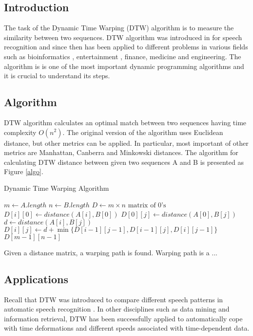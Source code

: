 \documentclass{article}
\date{\today}
\begin{document}
	\subsection*{Introduction}
	The task of the Dynamic Time Warping (DTW) algorithm is to measure the similarity between two sequences. DTW algorithm was introduced in \cite{Sakoe:1990:DPA:108235.108244} for speech recognition and since then has been applied to different problems in various fields such as bioinformatics \cite{journals/bioinformatics/AachC01}, entertainment \cite{Zhu:2003:WIE:872757.872780}, finance, medicine and engineering. The algorithm is is one of the most important dynamic programming algorithms and it is crucial to understand its steps.
	
	\subsection*{Algorithm}
	
	DTW algorithm calculates an optimal match between two sequences having time complexity $O(n^2)$. The original version of the algorithm uses Euclidean distance, but other metrics can be applied. In particular, most important of other metrics are Manhattan, Canberra and Minkowski distances. The algorithm for calculating DTW distance between given two sequences A and B is presented as Figure \ref{algo}. 
	
	\begin{algorithm}
		\caption{Dynamic Time Warping Algorithm}\label{algo}
		\begin{algorithmic}[1]
			\State $m \gets A.length$
			\State $n \gets B.length$
			\State $D \gets m \times n \text{ matrix of } 0\text{'s}$
			\State $D[i][0] \gets distance(A[i], B[0])$
			\EndFor		
			\State $D[0][j] \gets distance(A[0], B[j])$
			\EndFor
				\State $d \gets distance(A[i], B[j])$
				\State $D[i][j] \gets d + \min\{D[i-1][j-1], D[i-1][j], D[i][j-1]\}$
			\EndFor
			\EndFor
			\Return $D[m-1][n-1]$
			\EndFunction
		\end{algorithmic}
		\end{algorithm}
		Given a distance matrix, a warping path is found. Warping path is a ...
		\subsection*{Applications}
	Recall that DTW was introduced to compare different
	speech patterns in automatic speech recognition \cite{Sakoe:1990:DPA:108235.108244}. In other disciplines such as
	data mining and information retrieval, DTW has been successfully applied
	to automatically cope with time deformations and different speeds associated
	with time-dependent data. 
	
 

\end{document}
